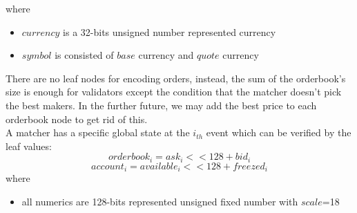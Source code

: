 \documentclass[a4paper,12pt]{article}
\begin{document}
where\\
\begin{itemize}
    \item $currency$ is a 32-bits unsigned number represented currency
    \item $symbol$ is consisted of $base$ currency and $quote$ currency
\end{itemize}
There are no leaf nodes for encoding orders, instead, the sum of the orderbook's size is enough for validators except the condition that the matcher doesn't pick the best makers. In the further future, we may add the best price to each orderbook node to get rid of this.\\
A matcher has a specific global state at the \(i_{th}\) event which can be verified by the leaf values:\\
\begin{equation*}
    orderbook_{i} = ask_{i} << 128 + bid_{i}
\end{equation*}
\begin{equation*}
    account_{i} = available_{i} << 128 + freezed_{i}
\end{equation*}
where\\
\begin{itemize}
    \item all numerics are 128-bits represented unsigned fixed number with $scale$=18
\end{itemize}
\end{document}
